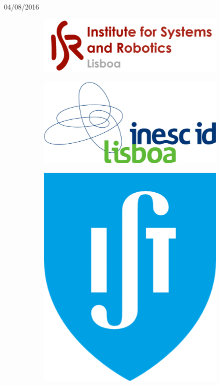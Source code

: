 \begin{titlepage}


{\large 04/08/2016}\\[1cm] %




\begin{figure}
\centering
\begin{subfigure}{.5\textwidth}
  \centering
  \includegraphics[width=.5\linewidth]{isr-logo.png}
\end{subfigure}%
\begin{subfigure}{.5\textwidth}
  \centering
  \includegraphics[width=.5\linewidth]{inesc-id-logo.png}
\end{subfigure}
\begin{subfigure}{.5\textwidth}
  \centering
  \includegraphics[width=.25\linewidth]{ist-logo.png}
\end{subfigure}
\end{figure}
 

\end{titlepage}
